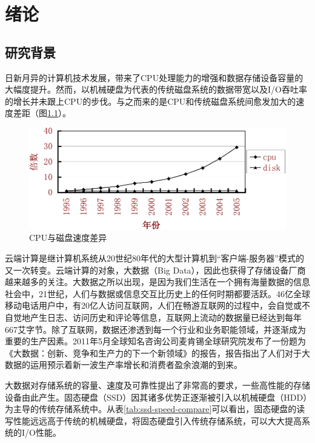 
\chapter{绪论}
\label{cha:introduction}

\section{研究背景}
\label{sec:background}

日新月异的计算机技术发展，带来了CPU处理能力的增强和数据存储设备容量的大幅度提升。然而，以机械硬盘为代表的传统磁盘系统的数据带宽以及I/O吞吐率的增长并未跟上CPU的步伐。与之而来的是CPU和传统磁盘系统间愈发加大的速度差距\cite{matthews2008intelturbomem}（图\ref{fig:cpu-disk-diff}）。

\begin{figure}[H]
\centering
\includegraphics[width=0.7\linewidth]{./graph/cpu-disk-gap}
\caption{CPU与磁盘速度差异}
\label{fig:cpu-disk-diff}
\end{figure}

云端计算\cite{jimgray2003cloud}是继计算机系统从20世纪80年代的大型计算机到“客户端-服务器”模式的又一次转变。云端计算的对象，大数据（Big Data），因此也获得了存储设备厂商越来越多的关注。大数据之所以出现，是因为我们生活在一个拥有海量数据的信息社会中，21世纪，人们与数据或信息交互比历史上的任何时期都要活跃。46亿全球移动电话用户中，有20亿人访问互联网，人们在畅游互联网的过程中，会自觉或不自觉地产生日志、访问历史和评论等信息，互联网上流动的数据量已经达到每年667艾字节。除了互联网，数据还渗透到每一个行业和业务职能领域，并逐渐成为重要的生产因素。2011年5月全球知名咨询公司麦肯锡全球研究院发布了一份题为《大数据：创新、竞争和生产力的下一个新领域》的报告，报告指出了人们对于大数据的运用预示着新一波生产率增长和消费者盈余浪潮的到来。

大数据对存储系统的容量、速度及可靠性提出了非常高的要求，一些高性能的存储设备由此产生。固态硬盘（SSD）因其诸多优势正逐渐被引入以机械硬盘（HDD）为主导的传统存储系统中\cite{morris2003evostorage}。从表\ref{tab:ssd-speed-compare}可以看出，固态硬盘的读写性能远远高于传统的机械硬盘\cite{libo2010cacheforssd}，将固态硬盘引入传统存储系统，可以大大提高系统的I/O性能。

